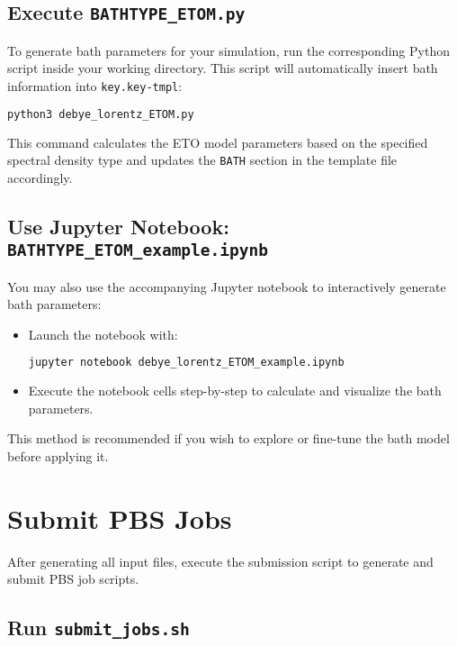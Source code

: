 \documentclass{article}
\begin{document}
\subsection*{Execute \texttt{BATHTYPE\_ETOM.py}}

To generate bath parameters for your simulation, run the corresponding Python script inside your working directory. This script will automatically insert bath information into \texttt{key.key-tmpl}:

\begin{lstlisting}[language=bash]
python3 debye_lorentz_ETOM.py
\end{lstlisting}

This command calculates the ETO model parameters based on the specified spectral density type and updates the \texttt{BATH} section in the template file accordingly.

\subsection*{Use Jupyter Notebook: \texttt{BATHTYPE\_ETOM\_example.ipynb}}

You may also use the accompanying Jupyter notebook to interactively generate bath parameters:

\begin{itemize}
    \item Launch the notebook with:
    \begin{lstlisting}[language=bash]
    jupyter notebook debye_lorentz_ETOM_example.ipynb
    \end{lstlisting}
    \item Execute the notebook cells step-by-step to calculate and visualize the bath parameters.
\end{itemize}

This method is recommended if you wish to explore or fine-tune the bath model before applying it.

\newpage 

\section{Submit PBS Jobs}

After generating all input files, execute the submission script to generate and submit PBS job scripts.

\subsection*{Run \texttt{submit\_jobs.sh}}
\end{document}
